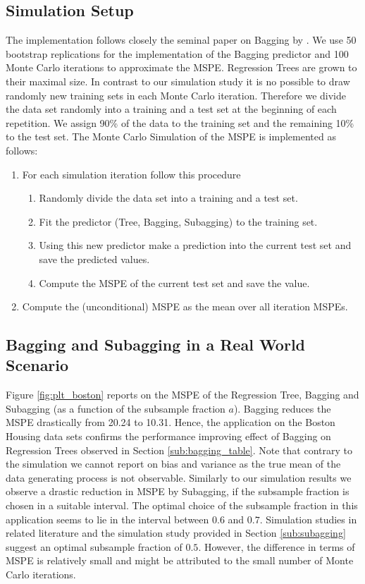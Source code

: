 \subsection{Simulation Setup}
The implementation follows closely the seminal paper on Bagging by \cite{Breiman1996}. We use 50 bootstrap replications for the implementation of the Bagging predictor and 100 Monte Carlo iterations to approximate the MSPE. Regression Trees are grown to their maximal size. In contrast to our simulation study it is no possible to draw randomly new training sets in each Monte Carlo iteration. Therefore we divide the data set randomly into a training and a test set at the beginning of each repetition. We assign 90\% of the data to the training set and the remaining 10\% to the test set. The Monte Carlo Simulation of the MSPE is implemented as follows:
	\begin{enumerate}
\item For each simulation iteration follow this procedure
	\begin{enumerate}
		\item Randomly divide the data set into a training and a test set.
		\item Fit the predictor (Tree, Bagging, Subagging) to the training set.
		\item Using this new predictor make a prediction into the current test set and save the predicted values.
		\item Compute the MSPE of the current test set and save the value.
	\end{enumerate}
\item Compute the (unconditional) MSPE as the mean over all iteration MSPEs.
\end{enumerate}

\subsection{Bagging and Subagging in a Real World Scenario}
Figure \ref{fig:plt_boston} reports on the MSPE of the Regression Tree, Bagging and Subagging (as a function of the subsample fraction $a$). Bagging reduces the MSPE drastically from 20.24 to 10.31. Hence, the application on the Boston Housing data sets confirms the performance improving effect of Bagging on Regression Trees observed in Section \ref{sub:bagging_table}. Note that contrary to the simulation we cannot report on bias and variance as the true mean of the data generating process is not observable.
%
Similarly to our simulation results we observe a drastic reduction in MSPE by Subagging, if the subsample fraction is chosen in a suitable interval. The optimal choice of the subsample fraction in this application seems to lie in the interval between $0.6$ and $0.7$. Simulation studies in related literature and the simulation study provided in Section \ref{sub:subagging} suggest an optimal subsample fraction of $0.5$. However, the difference in terms of MSPE is relatively small and might be attributed to the small number of Monte Carlo iterations.

